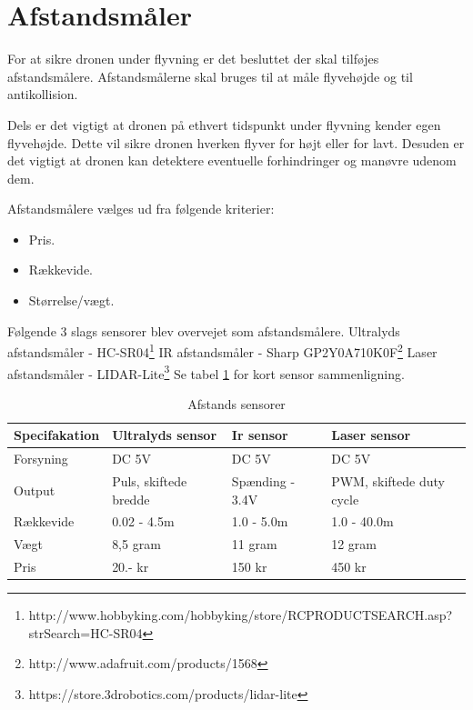 \section{Afstandsmåler}

For at sikre dronen under flyvning er det besluttet der skal tilføjes afstandsmålere. Afstandsmålerne skal bruges til at måle flyvehøjde og til antikollision.

Dels er det vigtigt at dronen på ethvert tidspunkt under flyvning kender egen flyvehøjde. Dette vil sikre dronen hverken flyver for højt eller for lavt. Desuden er det vigtigt at dronen kan detektere eventuelle forhindringer og manøvre udenom dem.

Afstandsmålere vælges ud fra følgende kriterier:  
\begin{itemize}
	\item Pris.
	\item Rækkevide. 
	\item Størrelse/vægt. 
\end{itemize}

\vspace{0.5cm}

Følgende 3 slags sensorer blev overvejet som afstandsmålere. 
\newline Ultralyds afstandsmåler - HC-SR04\footnote{http://www.hobbyking.com/hobbyking/store/RC\textunderscore PRODUCT\textunderscore SEARCH.asp?strSearch=HC-SR04}  
\newline IR afstandsmåler - Sharp GP2Y0A710K0F\footnote{http://www.adafruit.com/products/1568}  \newline Laser afstandsmåler - LIDAR-Lite\footnote{https://store.3drobotics.com/products/lidar-lite}  \newline Se tabel \ref{tab:Afstands_sensorer} for kort sensor sammenligning.

\begin{table}[H]
	\centering
		\begin{tabular}{|p{2.8cm}|p{3.4 cm}|p{3.4 cm}|p{3.4 cm}|} 
		\hline
			\textbf{Specifakation} 	& \textbf{Ultralyds sensor} 	& \textbf{Ir sensor} 		& \textbf{Laser sensor} \\ \hline
			 Forsyning 				& DC 5V 						& DC 5V 					& DC 5V \\ \hline			 
			 Output 				& Puls, \newline skiftede bredde 		& Spænding \newline 1.4 - 3.4V 		& PWM, \newline skiftede duty cycle\\ \hline
			 Rækkevide 					& 0.02 - 4.5m 					& 1.0 - 5.0m 				& 1.0 - 40.0m \\ \hline
			 Vægt 					& 8,5 gram 						& 11 gram 					& 12 gram \\ \hline
		 	 Pris 					& 20.- kr 						& 150 kr 					& 450 kr \\ \hline			 
		\end{tabular}
	\caption{Afstands sensorer}
	\label{tab:Afstands_sensorer}
\end{table}

